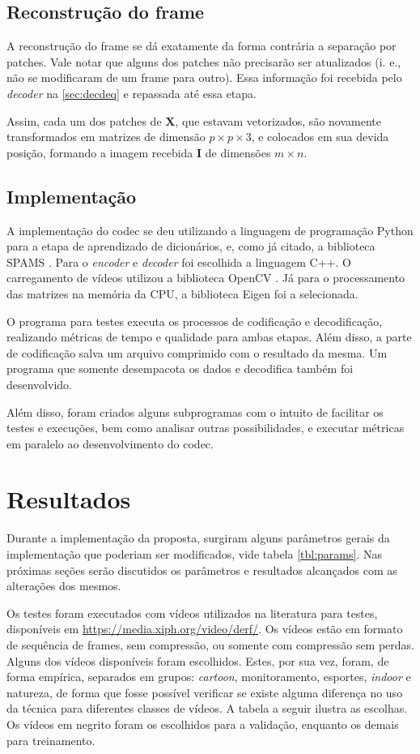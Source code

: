 \documentclass[cic,tc]{iiufrgs}
\newcommand{\mat}[1]{\bm{#1}}
\begin{document}
\section{Reconstrução do frame}
A reconstrução do frame se dá exatamente da forma contrária a separação por patches.
Vale notar que alguns dos patches não precisarão ser atualizados
(i. e., não se modificaram de um frame para outro).
Essa informação foi recebida pelo \textit{decoder} na \autoref{sec:decdeq} e repassada
até essa etapa.

Assim, cada um dos patches de $\mat{X}$, que estavam vetorizados, são novamente transformados
em matrizes de dimensão $p \times p \times 3$, e colocados em sua devida posição, formando
a imagem recebida $\mat{I}$ de dimensões $m \times n$.

\section{Implementação}
A implementação do codec se deu utilizando a linguagem de programação Python para a etapa 
de aprendizado de dicionários, e, como já citado, a biblioteca SPAMS \cite{SPAMS}.
Para o \emph{encoder} e \emph{decoder} foi escolhida a linguagem C++. 
O carregamento de vídeos utilizou a biblioteca OpenCV \cite{OpenCV}.
Já para o processamento das matrizes na memória da CPU, a biblioteca 
Eigen \cite{Eigen} foi a selecionada.

O programa para testes executa os processos de codificação e decodificação, realizando 
métricas de tempo e qualidade para ambas etapas.
Além disso, a parte de codificação salva um arquivo comprimido com o resultado da mesma.
Um programa que somente desempacota os dados e decodifica também foi desenvolvido.

Além disso, foram criados alguns subprogramas com o intuito de facilitar os testes e 
execuções, bem como analisar outras possibilidades, e executar métricas em paralelo ao 
desenvolvimento do codec.

\chapter{Resultados}
\label{sec:results}
Durante a implementação da proposta, surgiram alguns parâmetros gerais da implementação
que poderiam ser modificados, vide tabela \ref{tbl:params}. 
Nas próximas seções serão discutidos os parâmetros e resultados alcançados com as 
alterações dos mesmos.

Os testes foram executados com vídeos utilizados na literatura para testes,
disponíveis em \url{https://media.xiph.org/video/derf/}.
Os vídeos estão em formato de sequência de frames, sem compressão, ou somente com 
compressão sem perdas.
Alguns dos vídeos disponíveis foram escolhidos.
Estes, por sua vez, foram, de forma empírica, separados em grupos: \textit{cartoon}, 
monitoramento, esportes, \textit{indoor} e natureza, de forma que fosse possível 
verificar se existe alguma diferença no uso da técnica para diferentes classes de vídeos.
A tabela a seguir ilustra as escolhas.
Os vídeos em negrito foram os escolhidos para a validação, enquanto os demais para treinamento.
\end{document}
